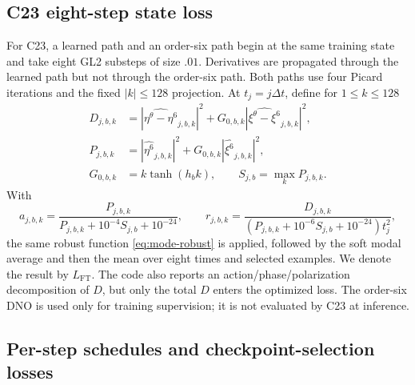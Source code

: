 \documentclass[11pt]{article}
\begin{document}
\subsection{C23 eight-step state loss}

For C23, a learned path and an order-six path begin at the same training state
and take eight GL2 substeps of size $.01$.  Derivatives are propagated through
the learned path but not through the order-six path.  Both paths use
four Picard iterations and the fixed $|k|\leq128$ projection.  At
$t_j=j\Delta t$, define for $1\leq k\leq128$
\begin{align}
  D_{j,b,k}
  &=|\widehat{\eta^\theta-\eta^6}_{j,b,k}|^2
  +G_{0,b,k}|\widehat{\xi^\theta-\xi^6}_{j,b,k}|^2,\\
  P_{j,b,k}
  &=|\widehat{\eta^6}_{j,b,k}|^2
  +G_{0,b,k}|\widehat{\xi^6}_{j,b,k}|^2,\\
  G_{0,b,k}&=k\tanh(h_bk),
  \qquad S_{j,b}=\max_kP_{j,b,k}.
\end{align}
With
\begin{equation}
 a_{j,b,k}=\frac{P_{j,b,k}}{P_{j,b,k}+10^{-4}S_{j,b}+10^{-24}},
 \qquad
 r_{j,b,k}=\frac{D_{j,b,k}}
 {(P_{j,b,k}+10^{-6}S_{j,b}+10^{-24})t_j^2},
\end{equation}
the same robust function \eqref{eq:mode-robust} is applied, followed by the
soft modal average and then the mean over eight times and selected examples.
We denote the result by $L_{\mathrm{FT}}$.  The code also reports an
action/phase/polarization decomposition of $D$, but only the total $D$ enters
the optimized loss.  The order-six DNO is used only for training supervision;
it is not evaluated by C23 at inference.

\subsection{Per-step schedules and checkpoint-selection losses}
\end{document}
